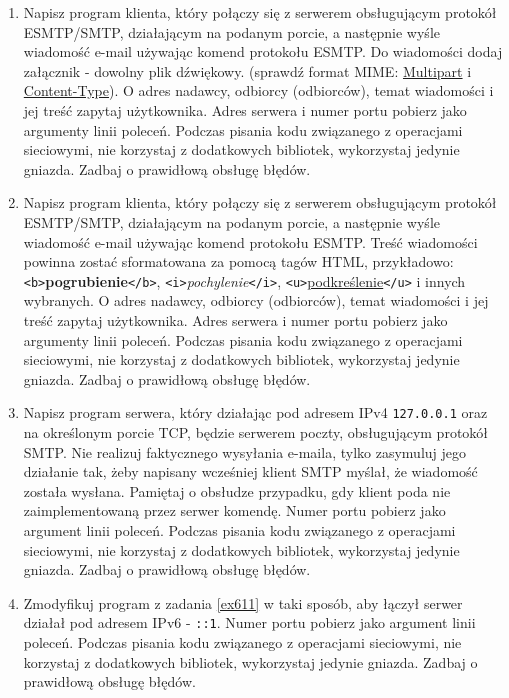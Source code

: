 \documentclass{article}
\begin{document}
\begin{enumerate}[label=\textbf{6.\arabic*}]
\item Napisz program klienta, który połączy się z serwerem obsługującym protokół ESMTP/SMTP, działającym  na podanym porcie, a następnie wyśle wiadomość e-mail używając komend protokołu ESMTP.  Do wiadomości dodaj załącznik - dowolny plik dźwiękowy. (sprawdź format MIME: \href{https://www.w3.org/Protocols/rfc1341/7_2_Multipart.html}{Multipart} i \href{https://www.w3.org/Protocols/rfc1341/7_3_Message.html}{Content-Type}).  O adres nadawcy, odbiorcy (odbiorców), temat wiadomości i jej treść zapytaj użytkownika. Adres serwera i numer portu pobierz jako argumenty linii poleceń. Podczas pisania kodu związanego z operacjami sieciowymi, nie korzystaj z dodatkowych bibliotek, wykorzystaj jedynie gniazda. Zadbaj o prawidłową obsługę błędów.

\item Napisz program klienta, który połączy się z serwerem obsługującym protokół ESMTP/SMTP, działającym  na podanym porcie, a następnie wyśle wiadomość e-mail używając komend protokołu ESMTP. Treść wiadomości powinna zostać sformatowana za pomocą tagów HTML, przykładowo: \texttt{<b>}\textbf{pogrubienie}\texttt{</b>}, \texttt{<i>}\textit{pochylenie}\texttt{</i>}, \texttt{<u>}\underline{podkreślenie}\texttt{</u>} i innych wybranych.   O adres nadawcy, odbiorcy (odbiorców), temat wiadomości i jej treść zapytaj użytkownika. Adres serwera i numer portu pobierz jako argumenty linii poleceń. Podczas pisania kodu związanego z operacjami sieciowymi, nie korzystaj z dodatkowych bibliotek, wykorzystaj jedynie gniazda. Zadbaj o prawidłową obsługę błędów.

\item  \label{ex611} Napisz program serwera, który działając pod adresem IPv4 \texttt{127.0.0.1} oraz na określonym porcie TCP, będzie serwerem poczty, obsługującym protokół SMTP. Nie realizuj faktycznego wysyłania e-maila, tylko zasymuluj jego działanie tak, żeby napisany wcześniej klient SMTP myślał, że wiadomość została wysłana. Pamiętaj o obsłudze przypadku, gdy klient poda nie zaimplementowaną przez serwer komendę. Numer portu pobierz jako argument linii poleceń. Podczas pisania kodu związanego z operacjami sieciowymi, nie korzystaj z dodatkowych bibliotek, wykorzystaj jedynie gniazda. Zadbaj o prawidłową obsługę błędów.

\item  Zmodyfikuj program z zadania \ref{ex611} w taki sposób,  aby łączył serwer działał pod adresem IPv6 - \texttt{::1}. Numer portu pobierz jako argument linii poleceń. Podczas pisania kodu związanego z operacjami sieciowymi, nie korzystaj z dodatkowych bibliotek, wykorzystaj jedynie gniazda. Zadbaj o prawidłową obsługę błędów. 

\end{enumerate}
\end{document}
